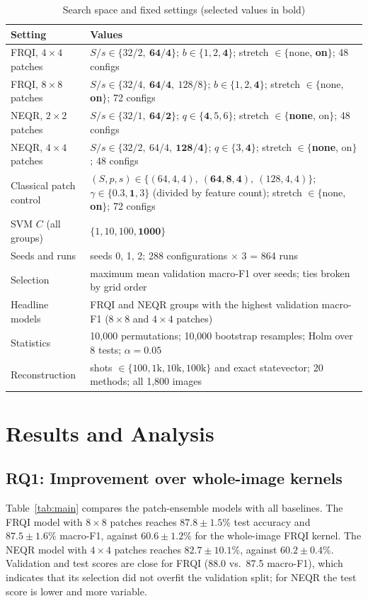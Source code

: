 \documentclass[12pt,onecolumn,draftclsnofoot]{IEEEtran}
\begin{document}
\begin{table}[!t]
\centering
\caption{Search space and fixed settings (selected values in bold)}
\label{tab:params}
\renewcommand{\baselinestretch}{1.1}\footnotesize
\begin{tabularx}{\linewidth}{@{}L{3.3cm}Y@{}}
\toprule
Setting & Values\\
\midrule
FRQI, $4\times4$ patches & $S/s\in\{32/2,\ \mathbf{64/4}\}$; $b\in\{1,2,\mathbf 4\}$; stretch $\in\{$none, \textbf{on}$\}$; 48 configs\\
FRQI, $8\times8$ patches & $S/s\in\{32/4,\ \mathbf{64/4},\ 128/8\}$; $b\in\{1,2,\mathbf 4\}$; stretch $\in\{$none, \textbf{on}$\}$; 72 configs\\
NEQR, $2\times2$ patches & $S/s\in\{32/1,\ \mathbf{64/2}\}$; $q\in\{\mathbf4,5,6\}$; stretch $\in\{$\textbf{none}, on$\}$; 48 configs\\
NEQR, $4\times4$ patches & $S/s\in\{32/2,\ 64/4,\ \mathbf{128/4}\}$; $q\in\{3,\mathbf4\}$; stretch $\in\{$\textbf{none}, on$\}$; 48 configs\\
Classical patch control & $(S,p,s)\in\{(64,4,4),\ \mathbf{(64,8,4)},\ (128,4,4)\}$; $\gamma\in\{0.3,\mathbf1,3\}$ (divided by feature count); stretch $\in\{$none, \textbf{on}$\}$; 72 configs\\
SVM $C$ (all groups) & $\{1,10,100,\mathbf{1000}\}$\\
Seeds and runs & seeds 0, 1, 2; 288 configurations $\times$ 3 = 864 runs\\
Selection & maximum mean validation macro-F1 over seeds; ties broken by grid order\\
Headline models & FRQI and NEQR groups with the highest validation macro-F1 ($8\times8$ and $4\times4$ patches)\\
Statistics & 10,000 permutations; 10,000 bootstrap resamples; Holm over 8 tests; $\alpha=0.05$\\
Reconstruction & shots $\in\{100, 1\text{k}, 10\text{k}, 100\text{k}\}$ and exact statevector; 20 methods; all 1,800 images\\
\bottomrule
\end{tabularx}
\end{table}

\section{Results and Analysis}
\subsection{RQ1: Improvement over whole-image kernels}
Table~\ref{tab:main} compares the patch-ensemble models with all baselines. The FRQI model with $8\times8$ patches reaches $87.8\pm1.5\%$ test accuracy and $87.5\pm1.6\%$ macro-F1, against $60.6\pm1.2\%$ for the whole-image FRQI kernel. The NEQR model with $4\times4$ patches reaches $82.7\pm10.1\%$, against $60.2\pm0.4\%$. Validation and test scores are close for FRQI (88.0 vs.\ 87.5 macro-F1), which indicates that its selection did not overfit the validation split; for NEQR the test score is lower and more variable.
\end{document}
